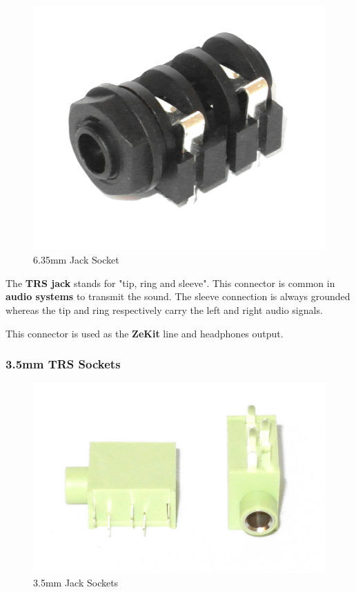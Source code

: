 \documentclass{scrartcl}
\begin{document}
\begin{figure}[!ht]
    \begin{center}
        \includegraphics[scale=0.20]{assets/zekit-jack.jpg}
        \caption{6.35mm Jack Socket}
    \end{center}
\end{figure}

The \textbf{TRS jack} stands for "tip, ring and sleeve". This connector is common in \textbf{audio systems} to transmit the sound. The sleeve connection is always grounded whereas the tip and ring respectively carry the left and right audio signals.

This connector is used as the \textbf{ZeKit} line and headphones output.

\pagebreak
\subsubsection{3.5mm TRS Sockets}

\begin{figure}[!ht]
    \begin{center}
        \includegraphics[scale=0.15]{assets/zekit-minijack.jpg}
        \caption{3.5mm Jack Sockets}
    \end{center}
\end{figure}
\end{document}
